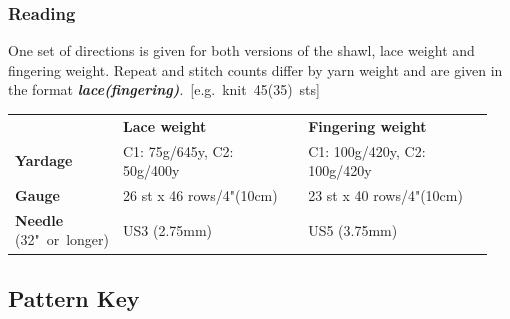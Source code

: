 \documentclass[12pt]{article}
\newcommand{\vocab}[1]{\emph{\textbf{#1}}} %
\begin{document}
\begin{titlingpage}
\begin{multicols}{2}
\vspace{-1em}

\subsubsection*{Reading}

One set of directions is given for both versions of the shawl, lace weight and fingering weight. Repeat and stitch counts differ by yarn weight and are given in the format \mbox{\vocab{lace(fingering)}. [e.g. knit 45(35) sts]} 
\end{multicols}

\vfill
\begin{tabular}{ | C{0.15\linewidth}  C{0.4\linewidth}  C{0.4\linewidth} |}
\thickhline {}
{} 			&\textbf{Lace weight} 	& \textbf{Fingering weight} \\ \thickhline
\textbf{Yardage}	& C1: 75g/645y, C2: 50g/400y		& C1: 100g/420y, C2: 100g/420y \\
\textbf{Gauge}	& {26 st x 46 rows/4"(10cm)}	& {23 st x 40 rows/4"(10cm)} \\ 
\textbf{Needle} \mbox{(32" or longer)}	& US3 (2.75mm)		& US5 (3.75mm) \\ \hline
\end{tabular}

\newpage

\subsection*{Pattern Key}


\end{titlingpage}
\end{document}
